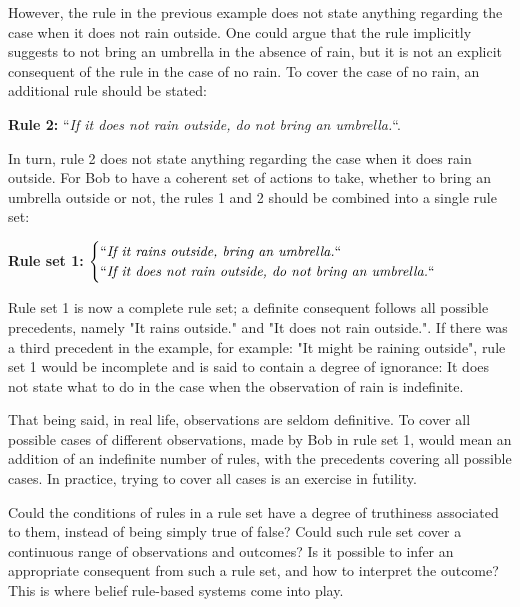 However, the rule in the previous example does not state anything
regarding the case when it does not rain outside. One could argue that the rule implicitly suggests to not bring an umbrella
in the absence of rain,
but it is not an explicit consequent of the rule in the case of no rain. To cover the case of no rain,
an additional rule should be stated:

\begin{displayquote}
\textbf{Rule 2:} ``\textit{If it does not rain outside, do not bring an umbrella.}``.
\end{displayquote}

In turn, rule 2 does not state anything regarding the case when it does rain outside. 
For Bob to have a coherent set of actions to take, whether to bring an umbrella outside or not,
the rules 1 and 2 should be combined into a single rule set:

\begin{displayquote}
\textbf{Rule set 1:}
$
\begin{cases}
``\textit{If it rains outside, bring an umbrella.}`` \\
``\textit{If it does not rain outside, do not bring an umbrella.}`` 
\end{cases}
$
\end{displayquote}

Rule set 1 is now a complete rule set; a definite consequent follows all possible precedents, namely "It rains outside."
and "It does not rain outside.". If there was a third precedent in the example, for example: "It might be raining outside", rule set 1
would be incomplete and is said to contain a degree of ignorance: It does not state what to do in the case when the observation of rain
is indefinite.

That being said, in real life, observations are seldom definitive. To cover all possible cases of
different observations, made by Bob in rule set 1,
would mean an addition of an indefinite number of rules, with the precedents covering all possible cases.
In practice, trying to cover all cases is an exercise in futility.

Could the conditions of rules in a rule set have a degree of truthiness associated to them, instead of being simply true of false?
Could such rule set cover a continuous range of observations and outcomes?
Is it possible to infer an appropriate consequent from such a rule set, and how to interpret the outcome?
This is where belief rule-based systems come into play.

